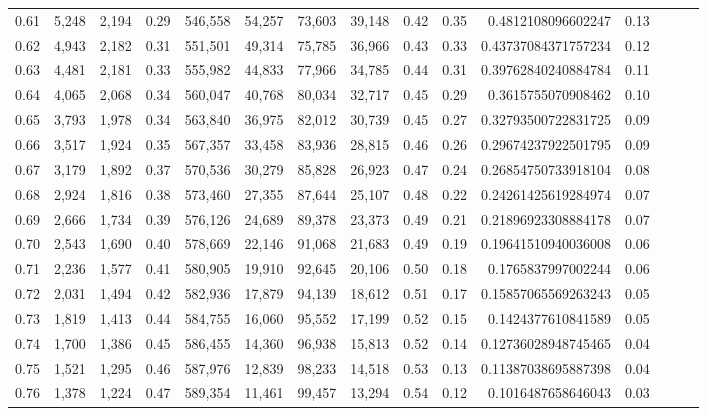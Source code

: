 \begin{tabular}{rrrrrrrrrrrrrrr}
0.61 &   5,248 &  2,194 &  0.29 &  546,558 &   54,257 &   73,603 &   39,148 &  0.42 &  0.35 &    0.4812108096602247 &      0.13 \\
0.62 &   4,943 &  2,182 &  0.31 &  551,501 &   49,314 &   75,785 &   36,966 &  0.43 &  0.33 &   0.43737084371757234 &      0.12 \\
0.63 &   4,481 &  2,181 &  0.33 &  555,982 &   44,833 &   77,966 &   34,785 &  0.44 &  0.31 &   0.39762840240884784 &      0.11 \\
0.64 &   4,065 &  2,068 &  0.34 &  560,047 &   40,768 &   80,034 &   32,717 &  0.45 &  0.29 &    0.3615755070908462 &      0.10 \\
0.65 &   3,793 &  1,978 &  0.34 &  563,840 &   36,975 &   82,012 &   30,739 &  0.45 &  0.27 &   0.32793500722831725 &      0.09 \\
0.66 &   3,517 &  1,924 &  0.35 &  567,357 &   33,458 &   83,936 &   28,815 &  0.46 &  0.26 &   0.29674237922501795 &      0.09 \\
0.67 &   3,179 &  1,892 &  0.37 &  570,536 &   30,279 &   85,828 &   26,923 &  0.47 &  0.24 &   0.26854750733918104 &      0.08 \\
0.68 &   2,924 &  1,816 &  0.38 &  573,460 &   27,355 &   87,644 &   25,107 &  0.48 &  0.22 &   0.24261425619284974 &      0.07 \\
0.69 &   2,666 &  1,734 &  0.39 &  576,126 &   24,689 &   89,378 &   23,373 &  0.49 &  0.21 &   0.21896923308884178 &      0.07 \\
0.70 &   2,543 &  1,690 &  0.40 &  578,669 &   22,146 &   91,068 &   21,683 &  0.49 &  0.19 &   0.19641510940036008 &      0.06 \\
0.71 &   2,236 &  1,577 &  0.41 &  580,905 &   19,910 &   92,645 &   20,106 &  0.50 &  0.18 &    0.1765837997002244 &      0.06 \\
0.72 &   2,031 &  1,494 &  0.42 &  582,936 &   17,879 &   94,139 &   18,612 &  0.51 &  0.17 &   0.15857065569263243 &      0.05 \\
0.73 &   1,819 &  1,413 &  0.44 &  584,755 &   16,060 &   95,552 &   17,199 &  0.52 &  0.15 &    0.1424377610841589 &      0.05 \\
0.74 &   1,700 &  1,386 &  0.45 &  586,455 &   14,360 &   96,938 &   15,813 &  0.52 &  0.14 &   0.12736028948745465 &      0.04 \\
0.75 &   1,521 &  1,295 &  0.46 &  587,976 &   12,839 &   98,233 &   14,518 &  0.53 &  0.13 &   0.11387038695887398 &      0.04 \\
0.76 &   1,378 &  1,224 &  0.47 &  589,354 &   11,461 &   99,457 &   13,294 &  0.54 &  0.12 &    0.1016487658646043 &      0.03 \\

\end{tabular}
